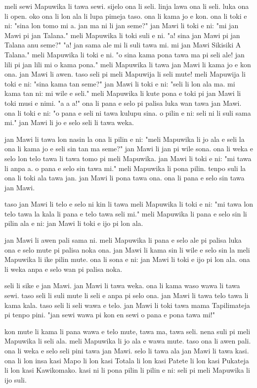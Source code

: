 meli sewi Mapuwika li tawa sewi.
sijelo ona li seli.
linja lawa ona li seli.
luka ona li open.
oko ona li lon ala li lupa pimeja taso.
ona li kama jo e kon.
ona li toki e ni: "sina lon tomo mi a.
jan ma ni li jan seme?"
jan Mawi li toki e ni: "mi jan Mawi pi jan Talana."
meli Mapuwika li toki suli e ni.
"a!
sina jan Mawi pi jan Talana anu seme?"
"a!
jan sama ale mi li suli tawa mi.
mi jan Mawi Sikisiki A Talana."
meli Mapuwika li toki e ni.
"o sina kama pona tawa ma pi seli ale!
jan lili pi jan lili mi o kama pona."
meli Mapuwika li tawa jan Mawi li kama jo e kon ona.
jan Mawi li awen.
taso seli pi meli Mapuwija li seli mute!
meli Mapuwija li toki e ni: "sina kama tan seme?"
jan Mawi li toki e ni: "seli li lon ala ma.
mi kama tan ni: mi wile e seli."
meli Mapuwika li kute pona e toki pi jan Mawi li toki musi e nimi. "a a a!"
ona li pana e selo pi palisa luka wan tawa jan Mawi.
ona li toki e ni: "o pana e seli ni tawa kulupu sina.
o pilin e ni: seli ni li suli sama mi."
jan Mawi li jo e selo seli li tawa weka.

jan Mawi li tawa lon nasin la ona li pilin e ni:
"meli Mapuwika li jo ala e seli la ona li kama jo e seli sin tan ma seme?"
jan Mawi li jan pi wile sona.
ona li weka e selo lon telo tawa li tawa tomo pi meli Mapuwika.
jan Mawi li toki e ni: "mi tawa li anpa a.
o pana e selo sin tawa mi."
meli Mapuwika li pona pilin.
tenpo suli la ona li toki ala tawa jan.
jan Mawi li pona tawa ona.
ona li pana e selo sin tawa jan Mawi.

taso jan Mawi li telo e selo ni kin li tawa meli Mapuwika li toki e ni:
"mi tawa lon telo tawa la kala li pana e telo tawa seli mi."
meli Mapuwika li pana e selo sin li pilin ala e ni: jan Mawi li toki e ijo pi lon ala.

jan Mawi li awen pali sama ni.
meli Mapuwika li pana e selo ale pi palisa luka ona e selo mute pi palisa noka ona.
jan Mawi li kama sin li wile e selo sin la meli Mapuwika li ike pilin mute.
ona li sona e ni: jan Mawi li toki e ijo pi lon ala.
ona li weka anpa e selo wan pi palisa noka.

seli li sike e jan Mawi.
jan Mawi li tawa weka.
ona li kama waso wawa li tawa sewi.
taso seli li suli mute li seli e anpa pi selo ona.
jan Mawi li tawa telo tawa li kama kala.
taso seli li seli wawa e telo.
jan Mawi li toki tawa mama Tapilimateja pi tenpo pini.
"jan sewi wawa pi kon en sewi o pana e pona tawa mi!"

kon mute li kama li pana wawa e telo mute, tawa ma, tawa seli.
nena suli pi meli Mapuwika li seli ala.
meli Mapuwika li jo ala e wawa mute.
taso ona li awen pali.
ona li weka e selo seli pini tawa jan Mawi.
selo li tawa ala jan Mawi li tawa kasi.
ona li lon insa kasi Mapo li lon kasi Totala li lon kasi Patete li lon kasi Pukateja li lon kasi Kawikomako.
kasi ni li pona pilin li pilin e ni: seli pi meli Mapuwika li ijo suli.

